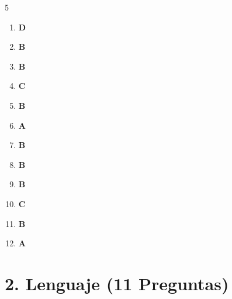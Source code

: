 \documentclass[10pt,a4paper]{article}
\begin{document}
\begin{tcolorbox}[colback=gray!5!white,colframe=gray!60!black,title=\textbf{CLAVE DE RESPUESTAS -- HISTORIA DE EL SALVADOR}]
\begin{multicols}{5}
\begin{enumerate}[label=\textbf{\arabic*.}]
  \item \textbf{D}
  \item \textbf{B}
  \item \textbf{B}
  \item \textbf{C}
  \item \textbf{B}
  \item \textbf{A}
  \item \textbf{B}
  \item \textbf{B}
  \item \textbf{B}
  \item \textbf{C}
  \item \textbf{B}
  \item \textbf{A}
\end{enumerate}
\end{multicols}
\end{tcolorbox}
\newpage\n
\section{2. Lenguaje (11 Preguntas)}
\end{document}
